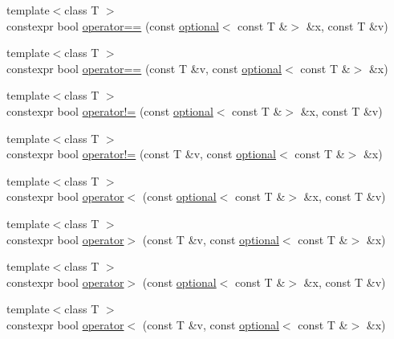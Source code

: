 \begin{DoxyCompactItemize}
\item 
{\footnotesize template$<$class T $>$ }\\constexpr bool \mbox{\hyperlink{namespacestd_1_1experimental_ad41e06efa15d85ead93eafecb8dde126}{operator==}} (const \mbox{\hyperlink{classstd_1_1experimental_1_1optional}{optional}}$<$ const T \&$>$ \&x, const T \&v)
\item 
{\footnotesize template$<$class T $>$ }\\constexpr bool \mbox{\hyperlink{namespacestd_1_1experimental_a9ff726fa7b981eeae6f6b8e98eb514ce}{operator==}} (const T \&v, const \mbox{\hyperlink{classstd_1_1experimental_1_1optional}{optional}}$<$ const T \&$>$ \&x)
\item 
{\footnotesize template$<$class T $>$ }\\constexpr bool \mbox{\hyperlink{namespacestd_1_1experimental_a007e24ca3b589918778709281a5611d7}{operator!=}} (const \mbox{\hyperlink{classstd_1_1experimental_1_1optional}{optional}}$<$ const T \&$>$ \&x, const T \&v)
\item 
{\footnotesize template$<$class T $>$ }\\constexpr bool \mbox{\hyperlink{namespacestd_1_1experimental_ab5a8b15ec09913c93bac27399f0cba38}{operator!=}} (const T \&v, const \mbox{\hyperlink{classstd_1_1experimental_1_1optional}{optional}}$<$ const T \&$>$ \&x)
\item 
{\footnotesize template$<$class T $>$ }\\constexpr bool \mbox{\hyperlink{namespacestd_1_1experimental_afd3f43608dc3267d32ee592ae88fba55}{operator$<$}} (const \mbox{\hyperlink{classstd_1_1experimental_1_1optional}{optional}}$<$ const T \&$>$ \&x, const T \&v)
\item 
{\footnotesize template$<$class T $>$ }\\constexpr bool \mbox{\hyperlink{namespacestd_1_1experimental_a3899be1cf909f9d5dc2718c912c73d67}{operator$>$}} (const T \&v, const \mbox{\hyperlink{classstd_1_1experimental_1_1optional}{optional}}$<$ const T \&$>$ \&x)
\item 
{\footnotesize template$<$class T $>$ }\\constexpr bool \mbox{\hyperlink{namespacestd_1_1experimental_ab62a91459215563e8996e69785166789}{operator$>$}} (const \mbox{\hyperlink{classstd_1_1experimental_1_1optional}{optional}}$<$ const T \&$>$ \&x, const T \&v)
\item 
{\footnotesize template$<$class T $>$ }\\constexpr bool \mbox{\hyperlink{namespacestd_1_1experimental_a3905d16fb3b1c1627ff2082e6159d4fb}{operator$<$}} (const T \&v, const \mbox{\hyperlink{classstd_1_1experimental_1_1optional}{optional}}$<$ const T \&$>$ \&x)

\end{DoxyCompactItemize}
